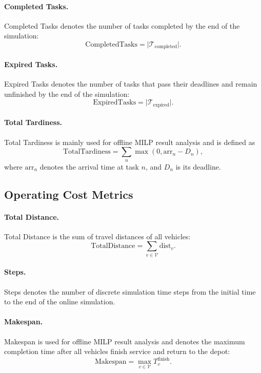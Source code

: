 \paragraph{Completed Tasks.}
Completed Tasks denotes the number of tasks completed by the end of the simulation:
\[
\mathrm{CompletedTasks}=\lvert\mathcal{T}_{\mathrm{completed}}\rvert.
\]

\paragraph{Expired Tasks.}
Expired Tasks denotes the number of tasks that pass their deadlines and remain unfinished by the end of the simulation:
\[
\mathrm{ExpiredTasks}=\lvert\mathcal{T}_{\mathrm{expired}}\rvert.
\]

\paragraph{Total Tardiness.}
Total Tardiness is mainly used for offline MILP result analysis and is defined as
\[
\mathrm{TotalTardiness}
=
\sum_n \max(0,\mathrm{arr}_n-D_n),
\]
where \(\mathrm{arr}_n\) denotes the arrival time at task \(n\), and \(D_n\) is its deadline.

\subsection{Operating Cost Metrics}

\paragraph{Total Distance.}
Total Distance is the sum of travel distances of all vehicles:
\[
\mathrm{TotalDistance}
=
\sum_{v\in\mathcal{V}}\mathrm{dist}_v.
\]

\paragraph{Steps.}
Steps denotes the number of discrete simulation time steps from the initial time to the end of the online simulation.

\paragraph{Makespan.}
Makespan is used for offline MILP result analysis and denotes the maximum completion time after all vehicles finish service and return to the depot:
\[
\mathrm{Makespan}=\max_{v\in\mathcal{V}}T_v^{\mathrm{finish}}.
\]

